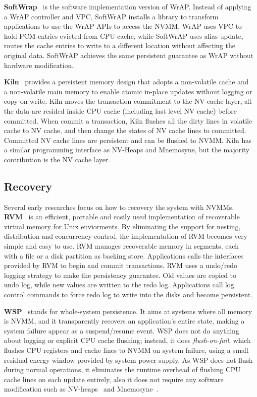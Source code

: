 \textbf{SoftWrap}~\cite{softWrAP}
 is the software implementation version of WrAP.
Instead of applying a WrAP controller and VPC, SoftWrAP installs a library
to transform applications to use the WrAP APIs to access the NVMM. WrAP
uses VPC to hold PCM entries evicted from CPU cache, while SoftWrAP
uses alias update, routes the cache entries to write to a different location
without affecting the original data. SoftWrAP achieves the same persistent
guarantee as WrAP without hardware modification.

\textbf{Kiln}~\cite{Kiln} provides a persistent memory design
 that adopts a non-volatile
cache and a non-volatile main memory to enable atomic in-place updates without
logging or copy-on-write. Kiln moves the transaction commitment to the NV
cache layer, all the data are resided inside CPU cache (including last level
NV cache) before committed. When commit a transaction, Kiln flushes all
the dirty lines in volatile cache to NV cache, and then change the states of
NV cache lines to committed. Committed NV cache lines are persistent and
can be flushed to NVMM. Kiln has a similar programming interface as NV-Heaps
and Mnemosyne, but the majority contribution is the NV cache layer.

\subsection{Recovery} 
\label{sec:recovery}

Several early researches focus on how to recovery the system with NVMMs.
\textbf{RVM}~\cite{RVM} is an efficient,
 portable and easily used implementation of
recoverable virtual memory for Unix enviorments. By eliminating the support
for nesting, distribution and concurrency control, the implementation of 
RVM becomes very simple and easy to use. RVM manages recoverable memory in
segments, each with a file or a disk partition as backing store. Applications
calls the interfaces provided by RVM to begin and commit transactions. RVM
uses a undo/redo logging strategy to make the persistency guarantee. Old values
are copied to undo log, while new values are written to the redo log. Applications call log control commands to force redo log to write into the disks
and become persistent.

\textbf{WSP}~\cite{WSP} stands for whole-system persistence.
 It aims at systems where
all memory is NVMM, and it transparently recovers an application's entire state,
making a system failure appear as a suspend/resume event. WSP does not
do anything about logging or explicit CPU cache flushing; instead, it does 
\emph{flush-on-fail}, which flushes CPU registers and cache lines to NVMM
on system failure, using a small residual energy window provided by system
power supply. As WSP does not flush during normal operations, it eliminates
the runtime overhead of flushing CPU cache lines on each update entirely, also
it does not require any software modification such as NV-heaps~\cite{nvheaps}
 and Mnemosyne~\cite{mnemosyne}.

